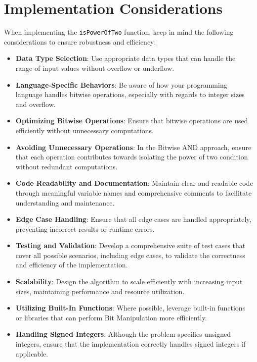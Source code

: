 \section*{Implementation Considerations}

When implementing the \texttt{isPowerOfTwo} function, keep in mind the following considerations to ensure robustness and efficiency:

\begin{itemize}
    \item \textbf{Data Type Selection}: Use appropriate data types that can handle the range of input values without overflow or underflow.
    
    \item \textbf{Language-Specific Behaviors}: Be aware of how your programming language handles bitwise operations, especially with regards to integer sizes and overflow.
    
    \item \textbf{Optimizing Bitwise Operations}: Ensure that bitwise operations are used efficiently without unnecessary computations.
    
    \item \textbf{Avoiding Unnecessary Operations}: In the Bitwise AND approach, ensure that each operation contributes towards isolating the power of two condition without redundant computations.
    
    \item \textbf{Code Readability and Documentation}: Maintain clear and readable code through meaningful variable names and comprehensive comments to facilitate understanding and maintenance.
    
    \item \textbf{Edge Case Handling}: Ensure that all edge cases are handled appropriately, preventing incorrect results or runtime errors.
    
    \item \textbf{Testing and Validation}: Develop a comprehensive suite of test cases that cover all possible scenarios, including edge cases, to validate the correctness and efficiency of the implementation.
    
    \item \textbf{Scalability}: Design the algorithm to scale efficiently with increasing input sizes, maintaining performance and resource utilization.
    
    \item \textbf{Utilizing Built-In Functions}: Where possible, leverage built-in functions or libraries that can perform Bit Manipulation more efficiently.
    
    \item \textbf{Handling Signed Integers}: Although the problem specifies unsigned integers, ensure that the implementation correctly handles signed integers if applicable.
\end{itemize}

